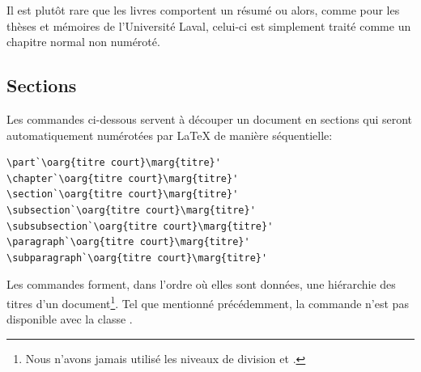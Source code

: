Il est plutôt rare que les livres comportent un résumé ou alors, comme
pour les thèses et mémoires de l'Université Laval, celui-ci
est simplement traité comme un chapitre normal non numéroté.

\subsection{Sections}
\label{sec:organisation:parties:sections}

Les commandes ci-dessous servent à découper un document en sections
qui seront automatiquement numérotées par {\LaTeX} de manière
séquentielle:
\begin{lstlisting}
\part`\oarg{titre court}\marg{titre}'
\chapter`\oarg{titre court}\marg{titre}'
\section`\oarg{titre court}\marg{titre}'
\subsection`\oarg{titre court}\marg{titre}'
\subsubsection`\oarg{titre court}\marg{titre}'
\paragraph`\oarg{titre court}\marg{titre}'
\subparagraph`\oarg{titre court}\marg{titre}'
\end{lstlisting}
Les commandes forment, dans l'ordre où elles sont données, une
hiérarchie des titres d'un document\footnote{%
  Nous n'avons jamais utilisé les niveaux de division
  \cmdprint{\paragraph} et \cmdprint{\subparagraph}.}. %
Tel que mentionné précédemment, la commande \cmd{\chapter} n'est pas
disponible avec la classe .

